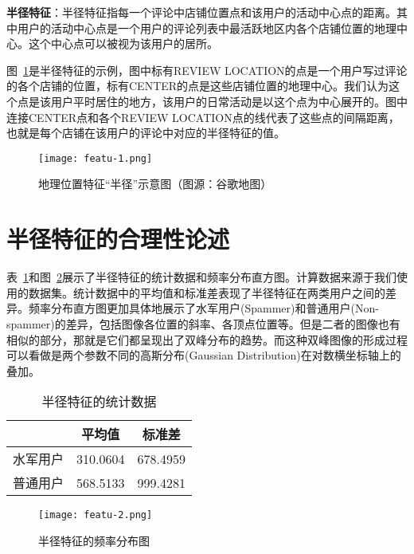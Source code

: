 \begin{defn}
	\textbf{半径特征}：半径特征指每一个评论中店铺位置点和该用户的活动中心点的距离。其中用户的活动中心点是一个用户的评论列表中最活跃地区内各个店铺位置的地理中心。这个中心点可以被视为该用户的居所。
\end{defn}

图~\ref{fig:radius}是半径特征的示例，图中标有REVIEW LOCATION的点是一个用户写过评论的各个店铺的位置，标有CENTER的点是这些店铺位置的地理中心。我们认为这个点是该用户平时居住的地方，该用户的日常活动是以这个点为中心展开的。图中连接CENTER点和各个REVIEW LOCATION点的线代表了这些点的间隔距离，也就是每个店铺在该用户的评论中对应的半径特征的值。

\begin{figure}[htbp]
	\centering
	\begin{minipage}[htbp]{\textwidth}
		\centering
		\texttt{[image: featu-1.png]}
		\caption[地理位置特征“半径”示意图]
		{地理位置特征“半径”示意图（图源：谷歌地图）\label{fig:radius}}		
	\end{minipage}     
\end{figure}



\section{半径特征的合理性论述}

表~\ref{tbl:radius}和图~\ref{fig:hist}展示了半径特征的统计数据和频率分布直方图。计算数据来源于我们使用的数据集。统计数据中的平均值和标准差表现了半径特征在两类用户之间的差异。频率分布直方图更加具体地展示了水军用户(Spammer)和普通用户(Non-spammer)的差异，包括图像各位置的斜率、各顶点位置等。但是二者的图像也有相似的部分，那就是它们都呈现出了双峰分布的趋势。而这种双峰图像的形成过程可以看做是两个参数不同的高斯分布(Gaussian Distribution)在对数横坐标轴上的叠加。

\begin{table}[htbp]
	\caption{半径特征的统计数据}
	\label{tbl:radius}
	\centering
	\begin{tabular}{ccc}
		\toprule
		& 平均值 & 标准差  \\
		\midrule
		水军用户      & 310.0604  & 678.4959  \\
		普通用户  & 568.5133  &	999.4281 \\
		\bottomrule
	\end{tabular}
\end{table}

\begin{figure}[htbp]
	\centering
	\begin{minipage}[htbp]{\textwidth}
		\centering
		\texttt{[image: featu-2.png]}
		\caption[半径特征的频率分布图]
		{半径特征的频率分布图\label{fig:hist}}		
	\end{minipage}     
\end{figure}

